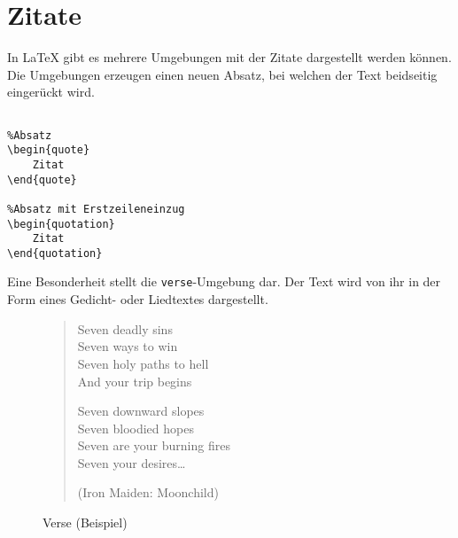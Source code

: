 \chapter{Zitate}
In \LaTeX{} gibt es mehrere Umgebungen mit der Zitate dargestellt werden können. Die Umgebungen erzeugen einen neuen Absatz, bei welchen der Text beidseitig eingerückt wird.
\begin{lstlisting}[caption={Quote (Befehle)}]

%Absatz
\begin{quote}
	Zitat
\end{quote}

%Absatz mit Erstzeileneinzug
\begin{quotation}
	Zitat
\end{quotation}
\end{lstlisting}
Eine Besonderheit stellt die \verb=verse=-Umgebung dar. Der Text wird von ihr in der Form eines Gedicht- oder Liedtextes dargestellt.
\begin{figure}[H]
\begin{verse}
Seven deadly sins\\
Seven ways to win\\
Seven holy paths to hell\\
And your trip begins

Seven downward slopes\\
Seven bloodied hopes\\
Seven are your burning fires\\
Seven your desires\dots

(Iron Maiden: Moonchild)
\end{verse}
\caption{Verse (Beispiel)}
\end{figure}